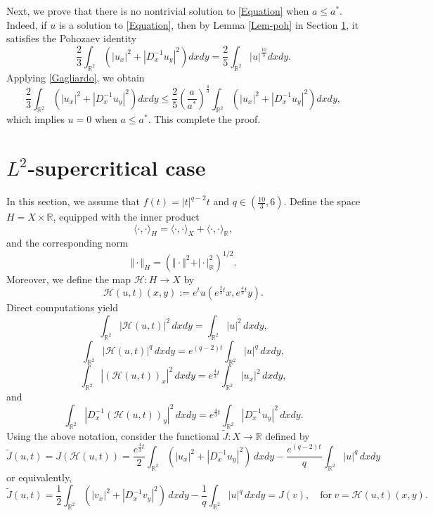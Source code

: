 \documentclass[11pt]{amsart}
\numberwithin{equation}{section}
\begin{document}
{{{{Next, we prove that there is no nontrivial solution to \eqref{Equation} when $ a \leq a^{*} $.
Indeed, if $ u $ is a solution to \eqref{Equation}, {then by Lemma \ref{Lem-poh} in Section \ref{sec4}, it satisfies the Pohozaev identity}
\begin{equation}
    \frac{2}{3}\int_{\mathbb{R}^{2}}\left( |u_{x}|^{2} +|D^{-1}_{x} u_{y}|^{2}\right) dx dy=\frac{2}{5}\int_{\mathbb{R}^2} |u|^{\frac{10}{3}}dxdy.
\end{equation}
 Applying \eqref{Gagliardo}, we obtain
$$
\frac{2}{3}\int_{\mathbb{R}^{2}}\left( |u_{x}|^{2} +|D^{-1}_{x} u_{y}|^{2}\right) dx dy\leq\frac{2}{5}\left(\frac{a}{a^*}\right)^{\frac{4}{3}}\int_{\mathbb{R}^{2}}\left( |u_{x}|^{2} +|D^{-1}_{x} u_{y}|^{2}\right) dx dy,
$$
{which implies} $ u = 0 $ when $ a \leq a^{*} $.}  This complete the proof.
\section{$L^2$-supercritical case}\label{sec4}
In this section, we assume that {$f(t)=|t|^{q-2}t$} and $q \in (\frac{10}{3},6)$. Define the space $H=X \times \mathbb{R}$, equipped with the inner product
$$
\langle\cdot, \cdot\rangle_{H}=\langle\cdot, \cdot\rangle_{X}+\langle\cdot, \cdot\rangle_{\mathbb{R}},
$$
and the corresponding norm
$$
\Vert \cdot\Vert_{H}=(\Vert \cdot\Vert^{2}+ \vert \cdot\vert_{ \mathbb{R}}^{2})^{1/2}.
$$
{Moreover, we  define the map  $\mathcal{H}: H\rightarrow X$ by }
\begin{equation*}
    \mathcal{H}(u, t)(x, y):=e^{t}u(e^{\frac{2}{3}t}x,e^{\frac{4}{3}t}y).
\end{equation*}
{Direct computations yield}
$$
\int_{\mathbb{R}^2}|\mathcal{H}(u, t)|^2\,dxdy=\int_{\mathbb{R}^2}|u|^2\,dxdy,
$$
$$
\int_{\mathbb{R}^2}|\mathcal{H}(u, t)|^q\,dxdy=e^{(q-2)t}\int_{\mathbb{R}^2}|u|^q\,dxdy,
$$
$$
\int_{\mathbb{R}^2}|(\mathcal{H}(u, t))_x|^2\,dxdy=e^{\frac{4}{3}t}\int_{\mathbb{R}^2}|u_x|^2\,dxdy,
$$
and
$$
\int_{\mathbb{R}^2}|D_x^{-1}(\mathcal{H}(u, t))_y|^2\,dxdy=e^{\frac{4}{3}t}\int_{\mathbb{R}^2}|D^{-1}_{x} u_{y}|^2\,dxdy.
$$
{Using the above notation,} consider the functional $\tilde{J}: X\rightarrow \mathbb{R}$ defined by
$$
{   \tilde{J}(u, t)=J(\mathcal{H}(u, t))}=\frac{e^{\frac{4}{3}t}}{2}\int_{\mathbb{R}^2}\left(|u_x|^2+|D^{-1}_{x} u_{y}|^2\right)\,dxdy-\frac{e^{(q-2)t}}{q}\int_{\mathbb{R}^2}|u|^q\,dxdy
$$
or equivalently,
$$
\tilde{J}(u, t)=\frac{1}{2}\int_{\mathbb{R}^{2}} \left(|v_{x}|^{2} + |D^{-1}_{x} v_{y}|^{2} \right)\,dx dy-\frac{1}{q}\int_{\mathbb{R}^2}|u|^q\,dxdy=J(v),\quad  \mbox{for}\ v=\mathcal{H}(u, t)(x,y).
$$}}}
\end{document}
